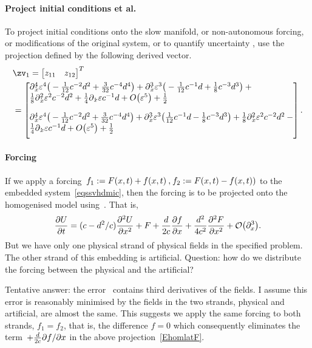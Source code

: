 \paragraph{Project initial conditions et al.}
To project initial conditions onto the slow manifold, or
non-autonomous forcing, or modifications of the original
system, or to quantify uncertainty \cite[Ch.12]{Roberts89b,
Roberts97b, Roberts2014a}, use the projection defined by the
following derived vector.
\begin{align*}&
\zv_1=\begin{bmatrix}z_{11}&z_{12}\end{bmatrix}^T
\\&
=\begin{bmatrix}
\ParMath{ \diff_{x}^{4} \eps^{4} \big(-\frac{1}{12} c^{-2} d^{2}+\frac{3}{32} c^{-4} d^{4}
\big)+\diff_{x}^{3} \eps^{3} \big(-\frac{1}{12} c^{-1} d+\frac{1}{8} c^{-3} d^{3}\big)+\frac{1}{8} \diff_{x}^{2} \eps^{2} c^{-2} d^{2}+\frac{1}{4} \diff_{x} \eps c^{-1} d+O
\big(\varepsilon ^{5}\big)+\frac{1}{2}
}\\[4ex]
\ParMath{ \diff_{x}^{4} \eps^{4} \big(-\frac{1}{12} c^{-2} d^{2}+\frac{3}{32} c^{-4} d^{4}
\big)+\diff_{x}^{3} \eps^{3} \big(\frac{1}{12} c^{-1} d-\frac{1}{8} c^{-3} d^{3}\big)+\frac{1}{8} \diff_{x}^{2} \eps^{2} c^{-2} d^{2}-\frac{1}{4} \diff_{x} \eps c^{-1} d+O\big(
\varepsilon ^{5}\big)+\frac{1}{2}
}
\end{bmatrix}.
\end{align*}


\paragraph{Forcing}
If we apply a forcing~\(f_1:=F(x,t)+f(x,t)\C
f_2:=F(x,t)-f(x,t))\) to the embedded
system~\cref{eqssvhdmic}, then the forcing is to be
projected onto the homogenised model using~\zv.  That is,
\begin{equation}
\D tU= (c-d^2/c)\DD xU +F +\frac d{2c}\D xf 
+\frac{d^2}{4c^2}\DD xF +\Ord{\partial_x^3}.
\label{EhomlatF}
\end{equation}
But we have only one physical strand of physical fields in
the specified problem.  The other strand of this embedding
is artificial.  Question: how do we distribute the forcing
between the physical and the artificial?

Tentative answer: the error~ contains
third derivatives of the fields.  I assume this error is
reasonably minimised by the fields in the two strands,
physical and artificial, are almost the same.   This
suggests we apply the same forcing to both strands,
\(f_1=f_2\), that is, the difference \(f=0\) which
consequently eliminates the term~\(+\frac d{2c}\D xf\) in
the above projection~\cref{EhomlatF}.


